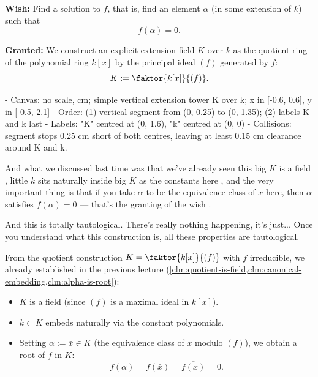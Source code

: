 \begin{content}
\textbf{Wish:} Find a solution to $f$, that is, find an element $\alpha$ (in some extension of $k$) such that
\[
f(\alpha) = 0.
\]

\textbf{Granted:} We construct an explicit extension field $K$ over $k$ as the quotient ring of the polynomial ring $k[x]$ by the principal ideal $(f)$ generated by $f$:
\[
K := \faktor{k[x]}{(f)}.
\]

\begin{hidden}
- Canvas: no scale, cm; simple vertical extension tower K over k; x in [-0.6, 0.6], y in [-0.5, 2.1]
- Order: (1) vertical segment from (0, 0.25) to (0, 1.35); (2) labels K and k last
- Labels: "K" centred at (0, 1.6), "k" centred at (0, 0)
- Collisions: segment stops 0.25 cm short of both centres, leaving at least 0.15 cm clearance around K and k.
\end{hidden}
\begin{center}
\end{center}
\end{content}

\begin{speech}[00:01:46 - 00:02:23]
And what we discussed last time was that we've already seen this big $K$ is a field , little $k$ sits naturally inside big $K$ as the constants here , and the very important thing is that if you take $\alpha$ to be the equivalence class of $x$ here, then $\alpha$ satisfies $f(\alpha) = 0$ --- that's the granting of the wish .

And this is totally tautological. There's really nothing happening, it's just... Once you understand what this construction is, all these properties are tautological.
\end{speech}

\begin{content}
From the quotient construction $K = \faktor{k[x]}{(f)}$ with $f$ irreducible, we already established in the previous lecture (\cref{clm:quotient-is-field,clm:canonical-embedding,clm:alpha-is-root}):
\begin{itemize}
    \item $K$ is a field (since $(f)$ is a maximal ideal in $k[x]$).
    \item $k \subset K$ embeds naturally via the constant polynomials.
    \item Setting $\alpha := \bar{x} \in K$ (the equivalence class of $x$ modulo $(f)$), we obtain a root of $f$ in $K$:
    \[
    f(\alpha) = f(\bar{x}) = \overline{f(x)} = 0.
    \]
\end{itemize}
\end{content}

